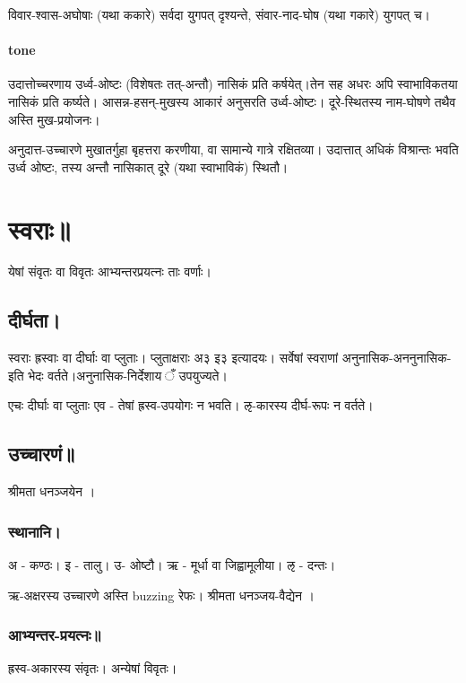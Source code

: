 \documentclass[oneside, article]{memoir}
\begin{document}
विवार-श्वास-अघोषाः (यथा ककारे) सर्वदा युगपत् दृश्यन्ते, संवार-नाद-घोष (यथा गकारे) युगपत् च।

\paragraph{tone}
उदात्तोच्चरणाय उर्ध्व-ओष्टः (विशेषतः तत्-अन्तौ) नासिकं प्रति कर्षयेत्।तेन सह अधरः अपि स्वाभाविकतया नासिकं प्रति कर्ष्यते। आसन्न-हसन्-मुखस्य आकारं अनुसरति उर्ध्व-ओष्टः। दूरे-स्थितस्य नाम-घोषणे तथैव अस्ति मुख-प्रयोजनः।

अनुदात्त-उच्चारणे मुखातर्गुहा बृहत्तरा करणीया, वा सामान्ये गात्रे रक्षितव्या। उदात्तात् अधिकं विश्रान्तः भवति उर्ध्व ओष्टः, तस्य अन्तौ नासिकात् दूरे (यथा स्वाभाविकं) स्थितौ।

\section{स्वराः॥}
येषां संवृतः वा विवृतः आभ्यन्तरप्रयत्नः ताः वर्णाः।

\subsection{दीर्घता।}
स्वराः ह्रस्वाः वा दीर्घाः वा प्लुताः। प्लुताक्षराः अ३ इ३ इत्यादयः। सर्वेषां स्वराणां अनुनासिक-अननुनासिक-इति भेदः वर्तते।अनुनासिक-निर्देशाय ँ उपयुज्यते।

एचः दीर्घाः वा प्लुताः एव - तेषां ह्रस्व-उपयोगः न भवति। ऌ-कारस्य दीर्घ-रूपः न वर्तते।


\subsection{उच्चारणं॥}
श्रीमता धनञ्जयेन ।


\subsubsection{स्थानानि।}
अ - कण्ठः। इ - तालु। उ- ओष्टौ। ऋ - मूर्धा वा जिह्वामूलीया। ऌ - दन्तः।

ऋ-अक्षरस्य उच्चारणे अस्ति buzzing रेफः। श्रीमता धनञ्जय-वैद्येन ।

\subsubsection{आभ्यन्तर-प्रयत्नः॥}
ह्रस्व-अकारस्य संवृतः। अन्येषां विवृतः।
\end{document}
